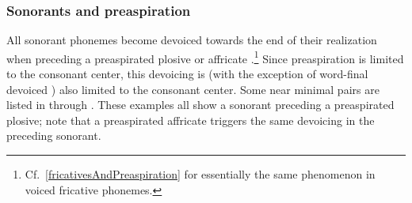 \subsubsection{Sonorants and preaspiration}\label{sonorantsAndPreaspiration}
All sonorant phonemes become devoiced towards the end of their realization when preceding a preaspirated plosive or affricate%
.\footnote{Cf.~\SEC\ref{fricativesAndPreaspiration} for essentially the same phenomenon in voiced fricative phonemes.} 
Since preaspiration is limited to the consonant center, this devoicing is (with the exception of word-final devoiced ) also limited to the consonant center. Some near minimal pairs are listed in  through . 
These examples all show a sonorant preceding a preaspirated plosive; note that a preaspirated affricate triggers the same devoicing in the preceding sonorant. 



